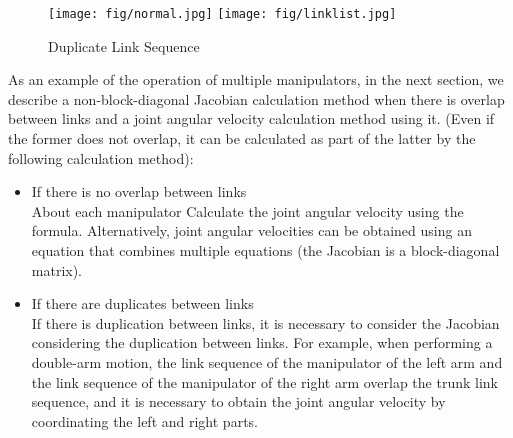 \begin{figure}[htb]
  \begin{center}
    \texttt{[image: fig/normal.jpg]}
    \texttt{[image: fig/linklist.jpg]}
    \caption{Duplicate Link Sequence}
  \end{center}
\end{figure}

As an example of the operation of multiple manipulators, in the next section, we describe a non-block-diagonal Jacobian calculation method when there is overlap between links and a joint angular velocity calculation method using it.
(Even if the former does not overlap, it can be calculated as part of the latter by the following calculation method):
\begin{itemize}
\item If there is no overlap between links \\
About each manipulator
Calculate the joint angular velocity using the  formula.
Alternatively, joint angular velocities can be obtained using an equation that combines multiple equations (the Jacobian is a block-diagonal matrix).
\item If there are duplicates between links\\
If there is duplication between links, it is necessary to consider the Jacobian considering the duplication between links.
For example, when performing a double-arm motion, the link sequence of the manipulator of the left arm and the link sequence of the manipulator of the right arm overlap the trunk link sequence, and it is necessary to obtain the joint angular velocity by coordinating the left and right parts.
\end{itemize}


